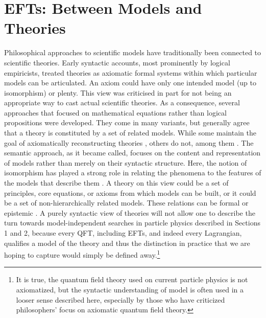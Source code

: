 \section{EFTs: Between Models and Theories} 		%
\label{sec:models} 

Philosophical approaches to scientific models have traditionally been connected to scientific theories. 
Early syntactic accounts, most prominently by logical empiricists, treated theories as axiomatic formal systems \citep[such as][]{carnap59,hempel66}
within which particular models can be articulated. 
An axiom could have only one intended model (up to isomorphism) or plenty. 
This view was criticised in part for not being an appropriate way to cast actual scientific theories. 
As a consequence, several approaches that focused on mathematical equations rather than logical propositions were developed.
They come in many variants, but generally agree that a theory is constituted by a set of related models. 
While some maintain the goal of axiomatically reconstructing theories \citep[among them][]{suppes60}, others do not, among them \citep{giere88}.
The semantic approach, as it became called, focuses on the content and representation of models rather than merely on their syntactic structure.
Here, the notion of isomorphism has played a strong role in relating the phenomena to the features of the models that describe them \citep{vf80}. 
A theory on this view could be a set of principles, core equations, or axioms from which models can be built, or it could be a set of non-hierarchically related models. These relations can be formal \citep{suppes60} or epistemic \citep{giere88}.
A purely syntactic view of theories will not allow one to describe the turn towards model-independent searches in particle physics described in Sections 1 and 2, because every QFT, including EFTs, and indeed every Lagrangian, qualifies a model of the theory and thus the distinction in practice that we are hoping to capture would simply be defined away.\footnote{It is true, the quantum field theory used on current particle physics is not axiomatized, but the syntactic understanding of model is often used in a looser sense described here, especially by those who have criticized philosophers' focus on axiomatic quantum field theory.}

